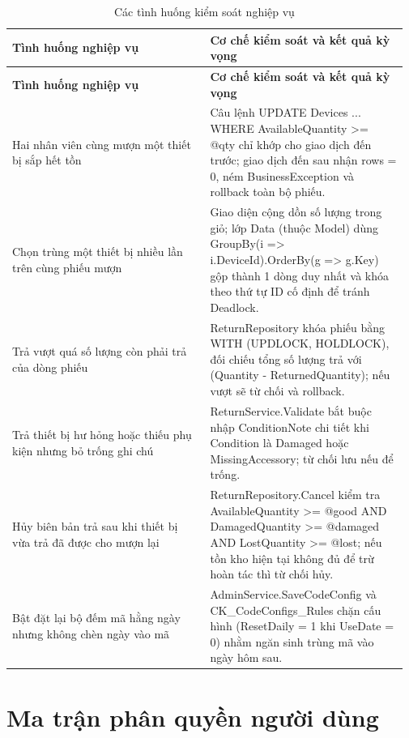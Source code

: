 {\small\setlength{\tabcolsep}{3pt}\renewcommand{\arraystretch}{1.25}
\begin{longtable}{|>{\raggedright\arraybackslash}p{0.485\linewidth}|>{\raggedright\arraybackslash}p{0.485\linewidth}|}
\caption{Các tình huống kiểm soát nghiệp vụ}\\
\hline
\rowcolor{gray!25}\textbf{\textbf{Tình huống nghiệp vụ}} & \textbf{\textbf{Cơ chế kiểm soát và kết quả kỳ vọng}} \\ \hline
\endfirsthead
\hline
\rowcolor{gray!25}\textbf{\textbf{Tình huống nghiệp vụ}} & \textbf{\textbf{Cơ chế kiểm soát và kết quả kỳ vọng}} \\ \hline
\endhead
\hline\endfoot
Hai nhân viên cùng mượn một thiết bị sắp hết tồn & Câu lệnh UPDATE Devices ... WHERE AvailableQuantity \textgreater{}= @qty chỉ khớp cho giao dịch đến trước; giao dịch đến sau nhận rows = 0, ném BusinessException và rollback toàn bộ phiếu. \\ \hline
Chọn trùng một thiết bị nhiều lần trên cùng phiếu mượn & Giao diện cộng dồn số lượng trong giỏ; lớp Data (thuộc Model) dùng GroupBy(i =\textgreater{} i.DeviceId).OrderBy(g =\textgreater{} g.Key) gộp thành 1 dòng duy nhất và khóa theo thứ tự ID cố định để tránh Deadlock. \\ \hline
Trả vượt quá số lượng còn phải trả của dòng phiếu & ReturnRepository khóa phiếu bằng WITH (UPDLOCK, HOLDLOCK), đối chiếu tổng số lượng trả với (Quantity - ReturnedQuantity); nếu vượt sẽ từ chối và rollback. \\ \hline
Trả thiết bị hư hỏng hoặc thiếu phụ kiện nhưng bỏ trống ghi chú & ReturnService.Validate bắt buộc nhập ConditionNote chi tiết khi Condition là Damaged hoặc MissingAccessory; từ chối lưu nếu để trống. \\ \hline
Hủy biên bản trả sau khi thiết bị vừa trả đã được cho mượn lại & ReturnRepository.Cancel kiểm tra AvailableQuantity \textgreater{}= @good AND DamagedQuantity \textgreater{}= @damaged AND LostQuantity \textgreater{}= @lost; nếu tồn kho hiện tại không đủ để trừ hoàn tác thì từ chối hủy. \\ \hline
Bật đặt lại bộ đếm mã hằng ngày nhưng không chèn ngày vào mã & AdminService.SaveCodeConfig và CK\_CodeConfigs\_Rules chặn cấu hình (ResetDaily = 1 khi UseDate = 0) nhằm ngăn sinh trùng mã vào ngày hôm sau. \\ \hline
\end{longtable}
}

\section{Ma trận phân quyền người dùng}

